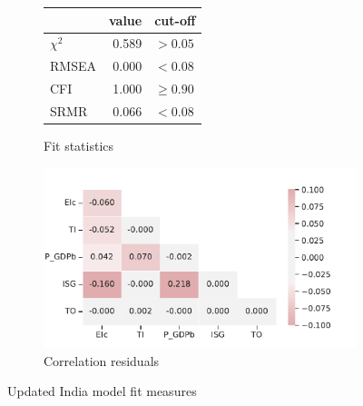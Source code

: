 \documentclass[11pt,a4paper]{article}
\begin{document}
\begin{figure}[htbp]
\begin{subfigure}{0.4\textwidth}
\centering
\begin{tabular}{lrl}
\toprule
{} &  value &      cut-off \\
\midrule
$\chi^2$ &  0.589 &     $> 0.05$ \\
RMSEA    &  0.000 &      $<0.08$ \\
CFI      &  1.000 &  $\geq 0.90$ \\
SRMR     &  0.066 &      $<0.08$ \\
\bottomrule
\end{tabular}
\caption{Fit statistics}
\label{tab:updated_fit_statistics}
\end{subfigure}
\begin{subfigure}{0.6\textwidth}
\centering
\includegraphics[width=\textwidth]{./plots/ind_correlation_residuals.pdf}
\caption{Correlation residuals}
\label{fig:updated_fit_residuals}
\end{subfigure}
\caption{Updated India model fit measures}
\label{fig:ind_fit}
\end{figure}
\end{document}
